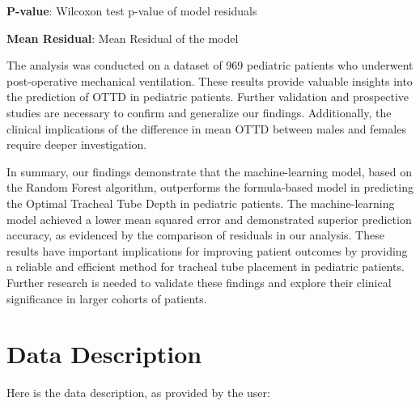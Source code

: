 \documentclass[11pt]{article}
\begin{document}
\begin{table}[h]
\caption{Comparison of model residuals (prediction - target) between Random Forest model and Formula-Based model}
\label{table:comparison_model}
\begin{threeparttable}
\renewcommand{\TPTminimum}{\linewidth}
\begin{tablenotes}
\footnotesize
\item \textbf{P-value}: Wilcoxon test p-value of model residuals
\item \textbf{Mean Residual}: Mean Residual of the model
\end{tablenotes}
\end{threeparttable}
\end{table}


The analysis was conducted on a dataset of 969 pediatric patients who underwent post-operative mechanical ventilation. These results provide valuable insights into the prediction of OTTD in pediatric patients. Further validation and prospective studies are necessary to confirm and generalize our findings. Additionally, the clinical implications of the difference in mean OTTD between males and females require deeper investigation.

In summary, our findings demonstrate that the machine-learning model, based on the Random Forest algorithm, outperforms the formula-based model in predicting the Optimal Tracheal Tube Depth in pediatric patients. The machine-learning model achieved a lower mean squared error and demonstrated superior prediction accuracy, as evidenced by the comparison of residuals in our analysis. These results have important implications for improving patient outcomes by providing a reliable and efficient method for tracheal tube placement in pediatric patients. Further research is needed to validate these findings and explore their clinical significance in larger cohorts of patients.


\clearpage
\appendix

\section{Data Description} \label{sec:data_description} Here is the data description, as provided by the user:
\end{document}
